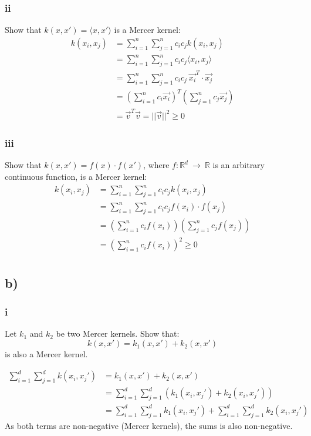 \documentclass{article}
\begin{document}
\subsubsection*{ii}
Show that
$k(x,x') = \langle x,x' \rangle$ is a Mercer kernel:\\
\begin{align}
k(x_i,x_j) &=\sum_{i=1}^n \sum_{j=1}^n c_i c_j k(x_i,x_j) \\
&= \sum_{i=1}^n \sum_{j=1}^n c_i c_j \langle x_i,x_j \rangle \\
&= \sum_{i=1}^n \sum_{j=1}^n c_i c_j \  \vec{x_i}^T \cdot \vec{x_j}  \\
&= (\sum_{i=1}^n c_i \vec{x_i})^T (\sum_{j=1}^n c_j \vec{x_j})  \\
&= \vec{v}^T \vec{v} = || \vec{v} ||^2 \geq 0
\end{align}

\subsubsection*{iii}
Show that $
k(x,x') = f(x)\cdot f(x')$, where $f:\mathbb{R}^d~\rightarrow~\mathbb{R}$ is an arbitrary continuous function, is a Mercer kernel:\\
\begin{align}
k(x_i,x_j) &=\sum_{i=1}^n \sum_{j=1}^n c_i c_j k(x_i,x_j) \\
&= \sum_{i=1}^n \sum_{j=1}^n c_i c_j f(x_i) \cdot f(x_j) \\
&= (\sum_{i=1}^n c_i f(x_i))(\sum_{j=1}^n c_j f(x_j)) \\
&= (\sum_{i=1}^n c_i f(x_i))^2 \geq 0 \\
\end{align}


\subsection*{b)}

\subsubsection*{i}
Let $k_1$ and $k_2$ be two Mercer kernels. Show that:
\begin{equation}
    k(x, x') = k_1(x, x') + k_2(x, x')
\end{equation}
is also a Mercer kernel.

\begin{align}
    \sum_{i=1}^d \sum_{j=1}^d k(x_i, x_j') &= k_1(x, x') + k_2(x, x') \\
    &= \sum_{i=1}^d \sum_{j=1}^d (k_1(x_i, x_j') + k_2(x_i, x_j'))\\
    &= \sum_{i=1}^d \sum_{j=1}^d k_1(x_i, x_j') + \sum_{i=1}^d \sum_{j=1}^d  k_2(x_i, x_j')
\end{align}
As both terms are non-negative (Mercer kernels), the sums is also non-negative.
\end{document}
